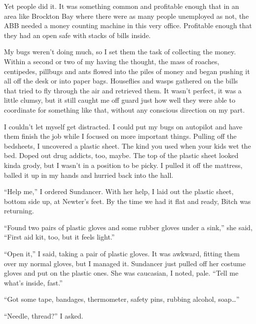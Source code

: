 Yet people did it.  It was something common and profitable enough that in an area like Brockton Bay where there were as many people unemployed as not, the ABB needed a money counting machine in this very office.  Profitable enough that they had an open safe with stacks of bills inside.



My bugs weren't doing much, so I set them the task of collecting the money.  Within a second or two of my having the thought, the mass of roaches, centipedes, pillbugs and ants flowed into the piles of money and began pushing it all off the desk or into paper bags.  Houseflies and wasps gathered on the bills that tried to fly through the air and retrieved them.  It wasn't perfect, it was a little clumsy, but it still caught me off guard just how well they were able to coordinate for something like that, without any conscious direction on my part.



I couldn't let myself get distracted.  I could put my bugs on autopilot and have them finish the job while I focused on more important things.  Pulling off the bedsheets, I uncovered a plastic sheet.  The kind you used when your kids wet the bed.  Doped out drug addicts, too, maybe.  The top of the plastic sheet looked kinda grody, but I wasn't in a position to be picky.  I pulled it off the mattress, balled it up in my hands and hurried back into the hall.



``Help me,'' I ordered Sundancer.  With her help, I laid out the plastic sheet, bottom side up, at Newter's feet.  By the time we had it flat and ready, Bitch was returning.



``Found two pairs of plastic gloves and some rubber gloves under a sink,'' she said, ``First aid kit, too, but it feels light.''



``Open it,'' I said, taking a pair of plastic gloves.  It was awkward, fitting them over my normal gloves, but I managed it.  Sundancer just pulled off her costume gloves and put on the plastic ones.  She was caucasian, I noted, pale.  ``Tell me what's inside, fast.''



``Got some tape, bandages, thermometer, safety pins, rubbing alcohol, soap\ldots''



``Needle, thread?'' I asked.



